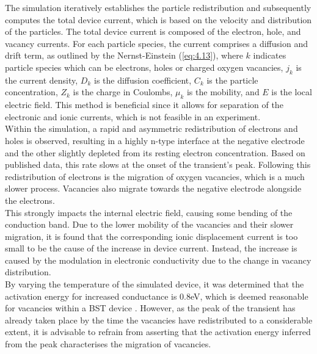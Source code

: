 \noindent The simulation iteratively establishes the particle redistribution and subsequently computes the total device current, which is based on the velocity and distribution of the particles. The total device current is composed of the electron, hole, and vacancy currents. For each particle species, the current comprises a diffusion and drift term, as outlined by the Nernst-Einstein (\ref{eq:4.13}), where $k$ indicates particle species which can be electrons, holes or charged oxygen vacancies, $j_k$ is the current density, $D_k$ is the diffusion coefficient, $C_k$ is the particle concentration, $Z_k$ is the charge in Coulombs, $\mu_k$ is the mobility, and $E$ is the local electric field. This method is beneficial since it allows for separation of the electronic and ionic currents, which is not feasible in an experiment. \\

\noindent Within the simulation, a rapid and asymmetric redistribution of electrons and holes is observed, resulting in a highly n-type interface at the negative electrode and the other slightly depleted from its resting electron concentration. Based on published data, this rate slows at the onset of the transient's peak. Following this redistribution of electrons is the migration of oxygen vacancies, which is a much slower process. Vacancies also migrate towards the negative electrode alongside the electrons. \\

\noindent This strongly impacts the internal electric field, causing some bending of the conduction band. Due to the lower mobility of the vacancies and their slower migration, it is found that the corresponding ionic displacement current is too small to be the cause of the increase in device current. Instead, the increase is caused by the modulation in electronic conductivity due to the change in vacancy distribution.\\


\noindent By varying the temperature of the simulated device, it was determined that the activation energy for increased conductance is 0.8eV, which is deemed reasonable for vacancies within a BST device \cite{zhong2010transient}. However, as the peak of the transient has already taken place by the time the vacancies have redistributed to a considerable extent, it is advisable to refrain from asserting that the activation energy inferred from the peak characterises the migration of vacancies. \\

